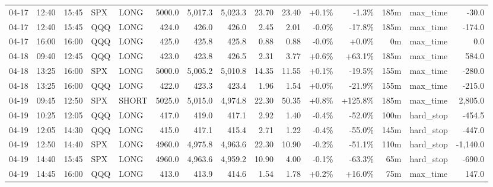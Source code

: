 \documentclass[11pt,a4paper,twoside]{article}
\begin{document}
\begin{landscape}
\begin{center}
\begin{longtable}{>{\color{txtmain}}l l l l l r r r r r r r r >{\color{txtmain}}l r}
04-17 & 12:40 & 15:45 & SPX & LONG & 5000.0 & 5,017.3 & 5,023.3 & 23.70 & 23.40 & \textcolor{wingreen}{+0.1\%} & \textcolor{lossred}{-1.3\%} & 185m & max\_time & \textcolor{lossred}{-30.0} \\
04-17 & 12:40 & 15:45 & QQQ & LONG & 424.0 & 426.0 & 426.0 & 2.45 & 2.01 & \textcolor{lossred}{-0.0\%} & \textcolor{lossred}{-17.8\%} & 185m & max\_time & \textcolor{lossred}{-174.0} \\
04-17 & 16:00 & 16:00 & QQQ & LONG & 425.0 & 425.8 & 425.8 & 0.88 & 0.88 & \textcolor{lossred}{-0.0\%} & \textcolor{wingreen}{+0.0\%} & 0m & max\_time & \textcolor{wingreen}{0.0} \\
04-18 & 09:40 & 12:45 & QQQ & LONG & 423.0 & 423.8 & 426.5 & 2.31 & 3.77 & \textcolor{wingreen}{+0.6\%} & \textcolor{wingreen}{+63.1\%} & 185m & max\_time & \textcolor{wingreen}{584.0} \\
04-18 & 13:25 & 16:00 & SPX & LONG & 5000.0 & 5,005.2 & 5,010.8 & 14.35 & 11.55 & \textcolor{wingreen}{+0.1\%} & \textcolor{lossred}{-19.5\%} & 155m & max\_time & \textcolor{lossred}{-280.0} \\
04-18 & 13:25 & 16:00 & QQQ & LONG & 422.0 & 423.3 & 423.4 & 1.96 & 1.54 & \textcolor{wingreen}{+0.0\%} & \textcolor{lossred}{-21.9\%} & 155m & max\_time & \textcolor{lossred}{-215.0} \\
04-19 & 09:45 & 12:50 & SPX & SHORT & 5025.0 & 5,015.0 & 4,974.8 & 22.30 & 50.35 & \textcolor{wingreen}{+0.8\%} & \textcolor{wingreen}{+125.8\%} & 185m & max\_time & \textcolor{wingreen}{2,805.0} \\
04-19 & 10:25 & 12:05 & QQQ & LONG & 417.0 & 419.0 & 417.1 & 2.92 & 1.40 & \textcolor{lossred}{-0.4\%} & \textcolor{lossred}{-52.0\%} & 100m & hard\_stop & \textcolor{lossred}{-454.5} \\
04-19 & 12:05 & 14:30 & QQQ & LONG & 415.0 & 417.1 & 415.4 & 2.71 & 1.22 & \textcolor{lossred}{-0.4\%} & \textcolor{lossred}{-55.0\%} & 145m & hard\_stop & \textcolor{lossred}{-447.0} \\
04-19 & 12:50 & 14:40 & SPX & LONG & 4960.0 & 4,975.8 & 4,963.6 & 22.30 & 10.90 & \textcolor{lossred}{-0.2\%} & \textcolor{lossred}{-51.1\%} & 110m & hard\_stop & \textcolor{lossred}{-1,140.0} \\
04-19 & 14:40 & 15:45 & SPX & LONG & 4960.0 & 4,963.6 & 4,959.2 & 10.90 & 4.00 & \textcolor{lossred}{-0.1\%} & \textcolor{lossred}{-63.3\%} & 65m & hard\_stop & \textcolor{lossred}{-690.0} \\
04-19 & 14:45 & 16:00 & QQQ & LONG & 413.0 & 413.9 & 414.6 & 1.54 & 1.78 & \textcolor{wingreen}{+0.2\%} & \textcolor{wingreen}{+16.0\%} & 75m & max\_time & \textcolor{wingreen}{147.0} \\

\end{longtable}
\end{center}
\end{landscape}
\end{document}
